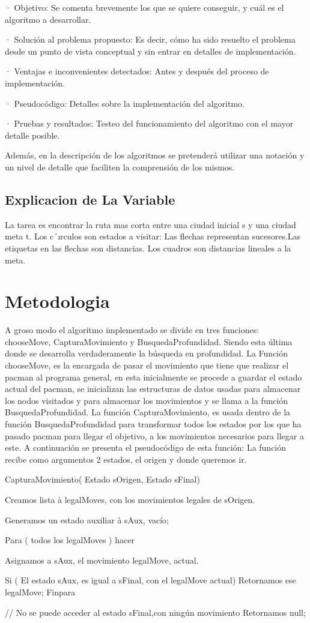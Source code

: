 \documentclass[letterpaper, 10 pt, conference]{ieeeconf}  %
\begin{document}
·    Objetivo: Se comenta brevemente los que se quiere conseguir, y cuál es el algoritmo a desarrollar.

·    Solución al problema propuesto: Es decir, cómo ha sido resuelto el problema desde un punto de vista conceptual y sin entrar en detalles de implementación.

·     Ventajas e inconvenientes detectados: Antes y después del proceso de implementación.

·     Pseudocódigo: Detalles sobre la implementación del algoritmo.

·     Pruebas y resultados: Testeo del funcionamiento del algoritmo con el mayor detalle posible.

Además,  en la descripción de los algoritmos se pretenderá utilizar una notación y un nivel de detalle que  faciliten la comprensión de los mismos. 

\subsection{Explicacion de La Variable}La tarea es encontrar la ruta mas corta entre una ciudad inicial s y una ciudad meta t. Los c´ırculos son estados a visitar: Las flechas representan sucesores.Las etiquetas en las flechas son distancias. Los cuadros son distancias lineales a la meta.


\section{Metodologia}
A groso modo el algoritmo implementado se divide en tres funciones: chooseMove, CapturaMovimiento y BusquedaProfundidad. Siendo esta última donde se desarrolla verdaderamente la búsqueda en profundidad.
La Función chooseMove, es la encargada de pasar el movimiento que tiene que realizar el pacman al programa general, en esta inicialmente se procede a guardar el estado actual del pacman, se inicializan las estructuras de datos usadas para almacenar los nodos visitados y para almacenar los movimientos y se llama a la función BusquedaProfundidad.
La función CapturaMovimiento, es usada dentro de la función BusquedaProfundidad para transformar todos los estados por los que ha pasado pacman para llegar el objetivo, a los movimientos necesarios para llegar a este. A continuación se presenta el pseudocódigo de esta función:
La función recibe como argumentos 2 estados, el origen y donde queremos ir.

CapturaMovimiento( Estado sOrigen, Estado sFinal){

Creamos lista à legalMoves, con los movimientos legales de sOrigen.

    Generamos un estado auxiliar à sAux, vacío;

    Para ( todos los legalMoves ) hacer
     
     Asignamos a sAux, el movimiento legalMove, actual.
     
Si ( El estado sAux, es igual a sFinal, con el legalMove actual)
Retornamos ese legalMove;
Finpara

// No se puede acceder al estado sFinal,con ningún movimiento
Retornamos null;
}
      
\end{document}
